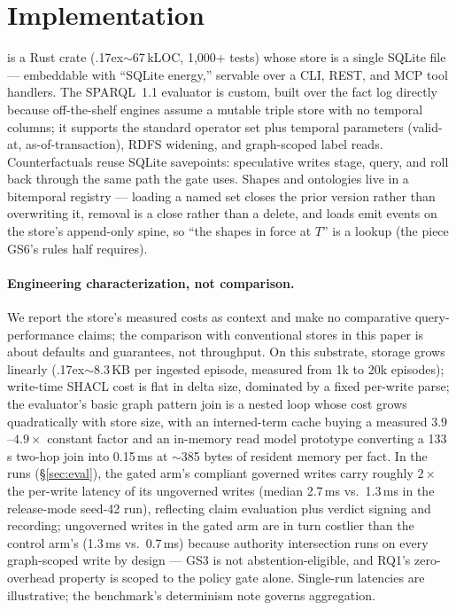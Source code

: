 \section{Implementation}
\label{sec:impl}

\sys is a Rust crate (\raise.17ex\hbox{$\scriptstyle\sim$}67\,kLOC,
1{,}000+ tests) whose store is a single SQLite file --- embeddable with
``SQLite energy,'' servable over a CLI, REST, and MCP tool handlers.
The SPARQL~1.1 evaluator is custom, built over the fact log directly
because off-the-shelf engines assume a mutable triple store with no
temporal columns; it supports the standard operator set plus temporal
parameters (valid-at, as-of-transaction), RDFS widening, and
graph-scoped label reads. Counterfactuals reuse SQLite savepoints:
speculative writes stage, query, and roll back through the same path
the gate uses. Shapes and ontologies live in a bitemporal registry ---
loading a named set closes the prior version rather than overwriting
it, removal is a close rather than a delete, and loads emit events on
the store's append-only spine, so ``the shapes in force at $T$'' is a
lookup (the piece GS6's rules half requires).

\paragraph{Engineering characterization, not comparison.}
We report the store's measured costs as context and make no
comparative query-performance claims; the comparison with conventional
stores in this paper is about defaults and guarantees, not throughput.
On this substrate, storage grows linearly
(\raise.17ex\hbox{$\scriptstyle\sim$}8.3\,KB per ingested episode,
measured from 1k to 20k episodes); write-time SHACL cost is flat in
delta size, dominated by a fixed per-write parse; the evaluator's
basic graph pattern join is a nested loop whose cost grows
quadratically with store size, with an interned-term cache buying a
measured $3.9$--$4.9\times$ constant factor and an in-memory read
model prototype converting a 133\,s two-hop join into 0.15\,ms at
$\sim$385 bytes of resident memory per fact. In the \census runs
(\S\ref{sec:eval}), the gated arm's compliant governed writes carry
roughly $2\times$ the per-write latency of its ungoverned writes
(median 2.7\,ms vs.\ 1.3\,ms in the release-mode seed-42 run),
reflecting claim evaluation plus verdict signing and recording;
ungoverned writes in the gated arm are in turn costlier than the
control arm's (1.3\,ms vs.\ 0.7\,ms) because authority intersection
runs on every graph-scoped write by design --- GS3 is not
abstention-eligible, and RQ1's zero-overhead property is scoped to the
policy gate alone. Single-run latencies are illustrative; the
benchmark's determinism note governs aggregation.

